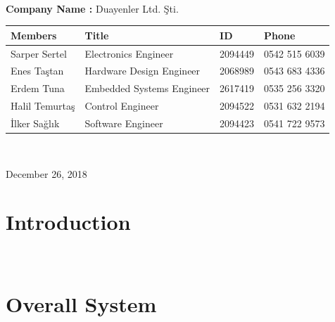 \documentclass[a4paper,12pt]{article}
\begin{document}
\begin{titlepage}
\begin{minipage}[r]{0.35\textwidth}
		\end{minipage}\\[1cm]
		\begin{minipage}{\textwidth}
			\begin{flushleft}
				\large{\textbf{Company Name :}}	Duayenler Ltd. Şti.\\
				\begin{table}[H]
					\begin{tabular}{l l l l}
						\hline
						\textbf{Members} & \textbf{Title}            & \textbf{ID} & \textbf{Phone} \\ \hline
						Sarper Sertel    & Electronics Engineer      & 2094449     & 0542 515 6039  \\ 
						Enes Taştan     & Hardware Design Engineer  & 2068989     & 0543 683 4336  \\ 
						Erdem Tuna       & Embedded Systems Engineer & 2617419     & 0535 256 3320  \\ 
						Halil Temurtaş  & Control Engineer          & 2094522     & 0531 632 2194  \\
						İlker Sağlık  & Software Engineer         & 2094423     & 0541 722 9573  \\ \hline
						
						
					\end{tabular}
				\end{table}
			\end{flushleft}
		\end{minipage}\\[1cm]
		
		\begin{flushbottom}
			{\large December 26, 2018} %
		\end{flushbottom}
		
	\end{titlepage}
	
	\tableofcontents
	\newpage
	
	\section{Introduction}
	
	\- \\[19cm]
	
		\section{Overall System}
	
\end{document}

